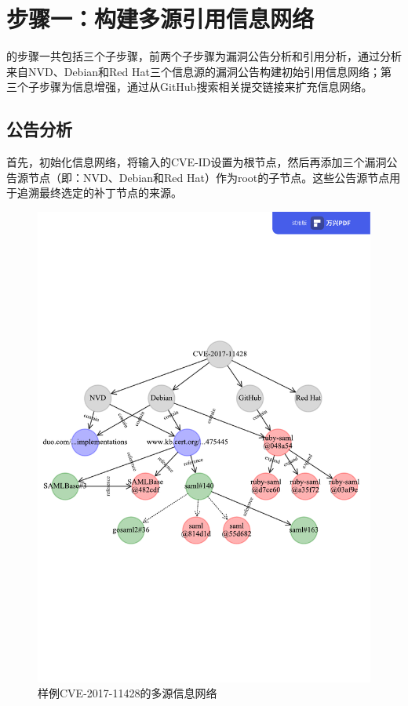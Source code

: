 \section{步骤一：构建多源引用信息网络}
\tool 的步骤一共包括三个子步骤，前两个子步骤为漏洞公告分析和引用分析，通过分析来自NVD、Debian和Red Hat三个信息源的漏洞公告构建初始引用信息网络；第三个子步骤为信息增强，通过从GitHub搜索相关提交链接来扩充信息网络。

\subsection{公告分析}
首先，\tool 初始化信息网络，将输入的CVE-ID设置为根节点，然后再添加三个漏洞公告源节点（即：NVD、Debian和Red Hat）作为root的子节点。这些公告源节点用于追溯最终选定的补丁节点的来源。

\begin{figure}[h]
    \centering
    \includegraphics[scale=0.68]{res/network-example.pdf}
    \caption{样例CVE-2017-11428的多源信息网络}\label{fig:example}
\end{figure}

